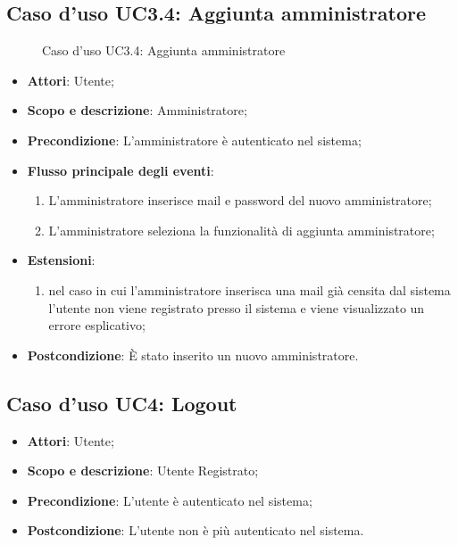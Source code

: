 \documentclass[12pt,a4paper]{article}
\begin{document}
\subsection{Caso d'uso UC3.4: Aggiunta amministratore}
\begin{figure}[H]
	\centering

	\caption{Caso d'uso UC3.4: Aggiunta amministratore}\label{fig:UC3.4} 
\end{figure}\begin{itemize}
\item \textbf{Attori}: Utente;
\item \textbf{Scopo e descrizione}: Amministratore; 
\item \textbf{Precondizione}: L'amministratore è autenticato nel sistema;

\item \textbf{Flusso principale degli eventi}:
\begin{enumerate}
	\item L'amministratore inserisce mail e password del nuovo amministratore;
	\item L'amministratore seleziona la funzionalità di aggiunta amministratore;
	
\end{enumerate}
\item \textbf{Estensioni}:
\begin{enumerate}
	\item nel caso in cui l’amministratore inserisca una mail già censita dal sistema l’utente non viene registrato presso il sistema e viene visualizzato un errore esplicativo;
	
\end{enumerate}
\item \textbf{Postcondizione}: È stato inserito un nuovo amministratore.
\end{itemize}
\hypertarget{UC4}{}
\subsection{Caso d'uso UC4: Logout}\begin{itemize}
	\item \textbf{Attori}: Utente;
	\item \textbf{Scopo e descrizione}: Utente Registrato; 
	\item \textbf{Precondizione}: L'utente è autenticato nel sistema;
	\item \textbf{Postcondizione}: L'utente non è più autenticato nel sistema.
\end{itemize}
\hypertarget{UC5}{}
\end{document}
